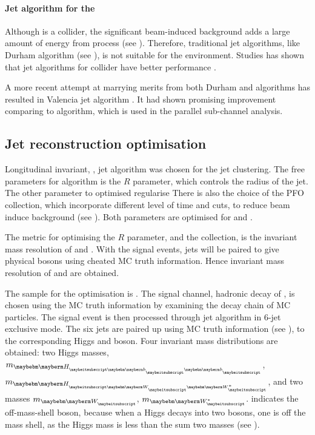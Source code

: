\paragraph{Jet algorithm for the \CLIC}

Although \CLIC is a \ee collider, the significant beam-induced background adds a large amount of energy from \ggHad process (see \Section{}). Therefore, traditional \ee jet algorithms, like Durham algorithm (see \Section{}), is not suitable for the \CLIC environment. Studies has shown that jet algorithms for \pp collider have better performance \cite{Linssen:2012hp,LCD-Note-2010-006}.

A more recent attempt at marrying merits from both Durham and \kt algorithms has resulted in Valencia jet algorithm \cite{Boronat:2014hva}. It had shown promising improvement comparing to \kt algorithm, which is used in the parallel  \eeToHHbbbb  sub-channel analysis.

\subsection{Jet reconstruction optimisation}
\label{sec:doubleHiggsJetOptimisation}
Longitudinal invariant, \kt, jet algorithm was chosen for the jet clustering. The free parameters for \kt algorithm is the $R$ parameter, which controls the radius of the jet. The other parameter to optimised regularise  There is also the choice of the PFO collection, which incorporate different level of time and \pT cuts, to reduce beam induce background (see \Section{}). Both parameters are optimised for  and .

The metric for optimising the $R$ parameter, and the \PFO collection, is the invariant mass resolution of \PHiggs and \PW. With the signal events, jets will be paired to give physical bosons using cheated MC truth information. Hence  invariant mass resolution of \PHiggs and \PW are obtained.


The sample for the optimisation is \eeToHH. The signal channel, hadronic decay of \eeToHHbbWWHad, is chosen using the MC truth information by  examining the decay chain of MC particles. The signal event is then processed through \kt jet algorithm  in 6-jet exclusive mode. The six jets are paired up using  MC truth information (see \Section{}), to the corresponding Higgs and \PW boson. Four invariant mass distributions are obtained: two Higgs masses, $m_{\Hbb}$, $m_{\HWW}$, and two \PW masses $m_{\PW}$, $m_{\W*}$. \W* indicates the off-mass-shell \PW boson, because when a Higgs decays into two \PW bosons, one \PW is off the mass shell, as the Higgs mass is less than the sum two \PW masses (see ).

